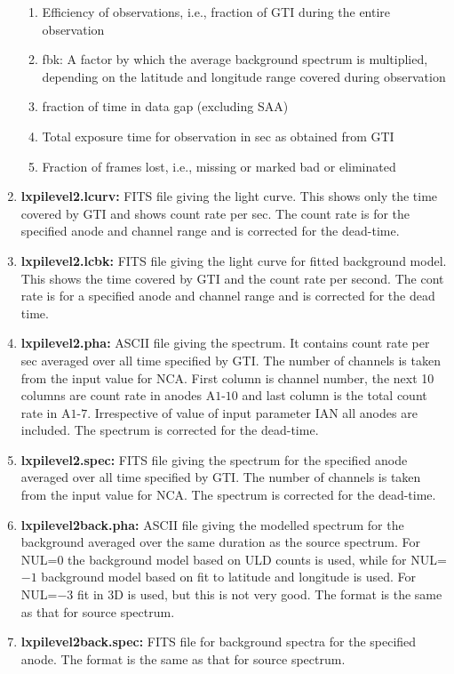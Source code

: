 \documentclass[a4paper,twoside]{report}
\numberwithin{equation}{section}
\begin{document}
\begin{enumerate}
{\begin{enumerate}
\item Efficiency of observations, i.e., fraction of GTI during the entire observation
\item fbk: A factor by which the average background spectrum is multiplied, depending on the latitude and longitude range covered during observation
\item fraction of time in data gap (excluding SAA)
\item Total exposure time for observation in sec as obtained from GTI
\item Fraction of frames lost, i.e., missing or marked bad or eliminated
\end{enumerate}
}
\item \textbf{lxpilevel2.lcurv:} FITS file giving the light curve. This shows only the time covered by GTI and shows count rate per sec. The count rate is for the specified anode and channel range and is corrected for the dead-time.
\item \textbf{lxpilevel2.lcbk:} FITS file giving the light curve for fitted background model. This shows the time covered by GTI and the count rate per second. The cont rate is for a specified anode and channel range and is corrected for the dead time. 
\item \textbf{lxpilevel2.pha:} ASCII file giving the spectrum. It contains count rate per sec averaged over all time specified by GTI. The number of channels is taken from the input value for NCA. First column is channel number, the next 10 columns are count rate in anodes A$1$-$10$ and last column is the total count rate in A$1$-$7$. Irrespective of value of input parameter IAN all anodes are included. The spectrum is corrected for the dead-time.
\item \textbf{lxpilevel2.spec:} FITS file giving the spectrum for the specified anode averaged over all time specified by GTI.  The number of channels is taken from the input value for NCA. The spectrum is corrected for the dead-time.
\item \textbf{lxpilevel2back.pha:} ASCII file giving the modelled spectrum for the background averaged over the same duration as the source spectrum. For NUL=0 the background model based on ULD counts is used, while for NUL=$-1$ background model based on fit to latitude and longitude is used.  For NUL=$-3$ fit in 3D is used, but this is not very good. The format is the same as that for source spectrum.
\item \textbf{lxpilevel2back.spec:} FITS file for background spectra for the specified anode. The format is the same as that for source spectrum.

\end{enumerate}
\end{document}
